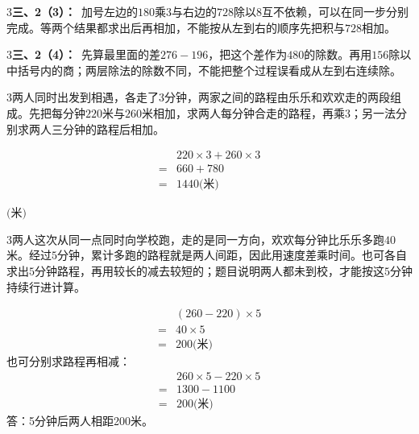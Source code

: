 \documentclass[multi=snippet,border={5bp 20bp 5bp 5bp}]{standalone}
\newenvironment{snippet}[3]{\begin{minipage}{#1bp}\color{answerred}\fontsize{#2}{#3}\selectfont\raggedright}{\end{minipage}}
\begin{document}
\begin{snippet}{505}{11.5}{14}\begin{multicols}{3}\raggedcolumns \textbf{三、2（3）：}\ 加号左边的\(180\)\allowbreak 乘\(3\)\allowbreak 与右边的\(728\)\allowbreak 除以\(8\)\allowbreak 互不依赖，可以在同一步分别完成。等两个结果都求出后再相加，不能按从左到右的顺序先把积与\(728\)\allowbreak 相加。\end{multicols}\end{snippet}
\begin{snippet}{505}{11.5}{14}\begin{multicols}{3}\raggedcolumns \textbf{三、2（4）：}\ 先算最里面的差\(276-196\)\allowbreak ，把这个差作为\(480\)\allowbreak 的除数。再用\(156\)\allowbreak 除以中括号内的商；两层除法的除数不同，不能把整个过程误看成从左到右连续除。\end{multicols}\end{snippet}
\begin{snippet}{505}{11.5}{14}\begin{multicols}{3}\raggedcolumns 两人同时出发到相遇，各走了\(3\)\allowbreak 分钟，两家之间的路程由乐乐和欢欢走的两段组成。先把每分钟\(220\)\allowbreak 米与\(260\)\allowbreak 米相加，求两人每分钟合走的路程，再乘\(3\)\allowbreak ；另一法分别求两人三分钟的路程后相加。\par \[\begin{aligned}&220\times3+260\times3\\={}&660+780\\={}&1440\text{(米)}\end{aligned}\]\end{multicols}\end{snippet}
\begin{snippet}{80}{9.4}{14}\SourceSans\setlength{\mathindent}{2bp}\(\text{(米)}\)\end{snippet}
\begin{snippet}{505}{11.5}{14}\begin{multicols}{3}\raggedcolumns 两人这次从同一点同时向学校跑，走的是同一方向，欢欢每分钟比乐乐多跑\(40\)\allowbreak 米。经过\(5\)\allowbreak 分钟，累计多跑的路程就是两人间距，因此用速度差乘时间。也可各自求出\(5\)\allowbreak 分钟路程，再用较长的减去较短的；题目说明两人都未到校，才能按这\(5\)\allowbreak 分钟持续行进计算。\par \[\begin{aligned}&(260-220)\times5\\={}&40\times5\\={}&200\text{(米)}\end{aligned}\]也可分别求路程再相减：\[\begin{aligned}&260\times5-220\times5\\={}&1300-1100\\={}&200\text{(米)}\end{aligned}\]答：5分钟后两人相距200米。\end{multicols}\end{snippet}
\end{document}
